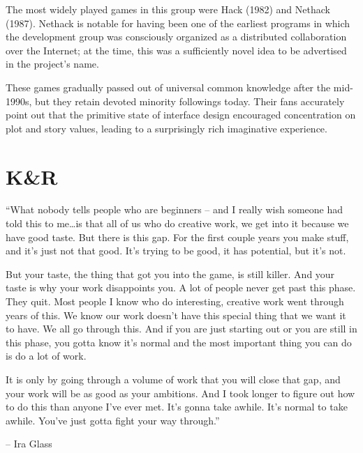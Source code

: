 \documentclass[10pt,twoside,openright]{memoir}
\begin{document}
The most widely played games in this group were Hack (1982) and Nethack (1987). Nethack is notable for having been one of the earliest programs in which the development group was consciously organized as a distributed collaboration over the Internet; at the time, this was a sufficiently novel idea to be advertised in the project's name.

These games gradually passed out of universal common knowledge after the mid-1990s, but they retain devoted minority followings today. Their fans accurately point out that the primitive state of interface design encouraged concentration on plot and story values, leading to a surprisingly rich imaginative experience.

\chapter{K\&R}

``What nobody tells people who are beginners -- and I really wish someone had told this to me\dots is that all of us who do creative work, we get into it because we have good taste. But there is this gap. For the first couple years you make stuff, and it's just not that good. It's trying to be good, it has potential, but it's not.

But your taste, the thing that got you into the game, is still killer. And your taste is why your work disappoints you. A lot of people never get past this phase. They quit. Most people I know who do interesting, creative work went through years of this. We know our work doesn't have this special thing that we want it to have. We all go through this. And if you are just starting out or you are still in this phase, you gotta know it's normal and the most important thing you can do is do a lot of work.

It is only by going through a volume of work that you will close that gap, and your work will be as good as your ambitions. And I took longer to figure out how to do this than anyone I've ever met. It's gonna take awhile. It's normal to take awhile. You've just gotta fight your way through.''

-- Ira Glass

\vskip 0.5in
\end{document}
